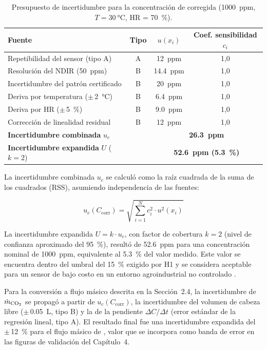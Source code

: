 \begin{table}[htbp]
\centering
\small
\caption{Presupuesto de incertidumbre para la concentración de  corregida (\SI{1000}{ppm}, $T = \SI{30}{\celsius}$, HR = \SI{70}{\percent}).}
\label{tab:presupuesto_incertidumbre}
\begin{tabular}{lccc}
\toprule
\textbf{Fuente} & \textbf{Tipo} & \textbf{$u(x_i)$} & \textbf{Coef. sensibilidad $c_i$} \\
\midrule
Repetibilidad del sensor (tipo A) & A & \SI{12}{ppm} & 1{,}0 \\
Resolución del NDIR (\SI{50}{ppm}) & B & \SI{14.4}{ppm} & 1{,}0 \\
Incertidumbre del patrón certificado & B & \SI{20}{ppm} & 1{,}0 \\
Deriva por temperatura ($\pm$\,\SI{2}{\celsius}) & B & \SI{6.4}{ppm} & 1{,}0 \\
Deriva por HR ($\pm$\,\SI{5}{\percent}) & B & \SI{9.0}{ppm} & 1{,}0 \\
Corrección de linealidad residual & B & \SI{12}{ppm} & 1{,}0 \\
\midrule
\textbf{Incertidumbre combinada} $u_c$ & & \multicolumn{2}{c}{\textbf{\SI{26.3}{ppm}}} \\
\textbf{Incertidumbre expandida} $U$ ($k=2$) & & \multicolumn{2}{c}{\textbf{\SI{52.6}{ppm} (\SI{5.3}{\percent})}} \\
\bottomrule
\end{tabular}
\end{table}

La incertidumbre combinada $u_c$ se calculó como la raíz cuadrada de la suma de los cuadrados (RSS), asumiendo independencia de las fuentes:

\begin{equation}
u_c(C_{\text{corr}}) = \sqrt{ \sum_{i=1}^{N} c_i^2 \cdot u^2(x_i) }
\label{eq:incertidumbre_combinada}
\end{equation}

La incertidumbre expandida $U = k \cdot u_c$, con factor de cobertura $k = 2$ (nivel de confianza aproximado del \SI{95}{\percent}), resultó de \SI{52.6}{ppm} para una concentración nominal de \SI{1000}{ppm}, equivalente al \SI{5.3}{\percent} del valor medido. Este valor se encuentra dentro del umbral del \SI{15}{\percent} exigido por H1 y se considera aceptable para un sensor de bajo costo en un entorno agroindustrial no controlado \parencite{biagiDevelopmentMachineLearningbased2024a}.

Para la conversión a flujo másico descrita en la Sección~2.4, la incertidumbre de $\dot{m}_{\ce{CO2}}$ se propagó a partir de $u_c(C_{\text{corr}})$, la incertidumbre del volumen de cabeza libre ($\pm$\,\SI{0.05}{L}, tipo B) y la de la pendiente $\Delta C/\Delta t$ (error estándar de la regresión lineal, tipo A). El resultado final fue una incertidumbre expandida del $\pm$\,\SI{12}{\percent} para el flujo másico de , valor que se incorpora como banda de error en las figuras de validación del Capítulo~4.

